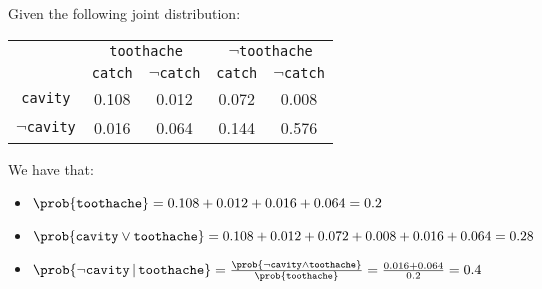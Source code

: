 \begin{example}
    Given the following joint distribution:
    \begin{center}
        \begin{tabular}{|c|c|c|c|c|}
            \cline{2-5}
            \multicolumn{1}{c|}{}    & \multicolumn{2}{c|}{\texttt{toothache}} & \multicolumn{2}{c|}{$\lnot$\texttt{toothache}} \\
            \cline{2-5}
            \multicolumn{1}{c|}{}    & \texttt{catch} & $\lnot$\texttt{catch} & \texttt{catch} & $\lnot$\texttt{catch} \\
            \hline
            \texttt{cavity}         & 0.108 & 0.012 & 0.072 & 0.008 \\
            $\lnot$\texttt{cavity}  & 0.016 & 0.064 & 0.144 & 0.576 \\
            \hline
        \end{tabular}
    \end{center}

    We have that:
    \begin{itemize}
        \item $\prob{\texttt{toothache}} = 0.108 + 0.012 + 0.016 + 0.064 = 0.2$
        \item $\prob{\texttt{cavity} \vee \texttt{toothache}} = 0.108 + 0.012 + 0.072 + 0.008 + 0.016 + 0.064 = 0.28$
        \item $\prob{\lnot\texttt{cavity} \,\vert\, \texttt{toothache}} = \frac{\prob{\lnot\texttt{cavity} \land \texttt{toothache}}}{\prob{\texttt{toothache}}} =
                \frac{0.016 + 0.064}{0.2} = 0.4$
    \end{itemize}
\end{example}

